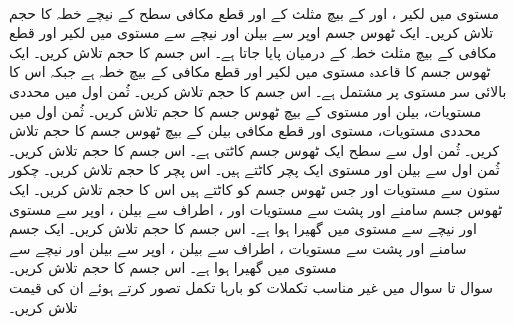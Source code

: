 \\
مستوی  میں لکیر ،  اور  کے بیچ مثلث کے اور  قطع مکافی سطح   کے نیچے  خطہ کا حجم تلاش کریں۔
ایک ٹھوس جسم  اوپر سے بیلن  اور نیچے سے مستوی  میں لکیر  اور قطع مکافی   کے بیچ مثلث   خطہ کے درمیان پایا جاتا ہے۔ اس جسم  کا حجم تلاش کریں۔
ایک ٹھوس جسم  کا قاعدہ مستوی  میں  لکیر  اور قطع مکافی  کے بیچ خطہ ہے جبکہ اس کا بالائی سر مستوی  پر مشتمل ہے۔  اس جسم کا حجم تلاش کریں۔
ثُمن  اول میں  محددی مستویات،  بیلن  اور مستوی  کے بیچ ٹھوس جسم کا حجم تلاش کریں۔ 
ثُمن اول میں  محددی مستویات، مستوی   اور قطع مکافی بیلن  کے بیچ ٹھوس جسم کا حجم تلاش کریں۔
ثُمن اول سے  سطح  ایک ٹھوس جسم کاٹتی ہے۔ اس جسم کا حجم تلاش کریں۔
ثُمن اول سے بیلن  اور مستوی   ایک  پچر کاٹتے ہیں۔ اس پچر کا حجم تلاش کریں۔
چکور ستون    سے مستویات   اور   جس ٹھوس جسم کو کاٹتے ہیں اس کا حجم تلاش کریں۔
ایک ٹھوس جسم  سامنے اور پشت سے  مستویات  اور ،  اطراف سے بیلن ، اوپر سے مستوی  اور نیچے سے مستوی  میں گھیرا ہوا ہے۔ اس جسم کا حجم تلاش کریں۔
ایک جسم سامنے اور پشت سے مستویات ، اطراف سے بیلن  ، اوپر سے بیلن  اور نیچے سے مستوی  میں گھیرا ہوا ہے۔ اس جسم کا حجم تلاش کریں۔
\\
سوال  تا سوال  میں غیر مناسب تکملات کو بارہا تکمل تصور کرتے ہوئے ان  کی قیمت تلاش کریں۔

